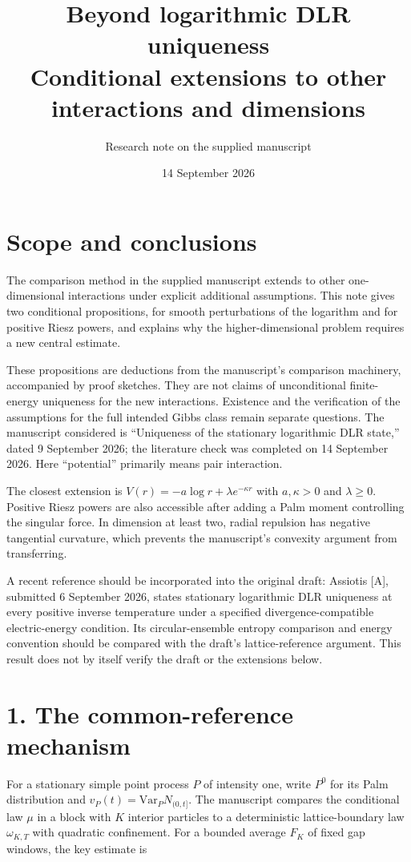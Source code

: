 \documentclass[11pt]{article}
\title{Beyond logarithmic DLR uniqueness\\\large Conditional extensions to other interactions and dimensions}
\author{Research note on the supplied manuscript}
\date{14 September 2026}
\begin{document}
\maketitle
\section*{Scope and conclusions}
The comparison method in the supplied manuscript extends to other one-dimensional interactions under explicit additional assumptions. This note gives two conditional propositions, for smooth perturbations of the logarithm and for positive Riesz powers, and explains why the higher-dimensional problem requires a new central estimate.

These propositions are deductions from the manuscript's comparison machinery, accompanied by proof sketches. They are not claims of unconditional finite-energy uniqueness for the new interactions. Existence and the verification of the assumptions for the full intended Gibbs class remain separate questions. The manuscript considered is ``Uniqueness of the stationary logarithmic DLR state,'' dated 9 September 2026; the literature check was completed on 14 September 2026. Here ``potential'' primarily means pair interaction.

The closest extension is $V(r)=-a\log r+\lambda e^{-\kappa r}$ with $a,\kappa>0$ and $\lambda\geq0$. Positive Riesz powers are also accessible after adding a Palm moment controlling the singular force. In dimension at least two, radial repulsion has negative tangential curvature, which prevents the manuscript's convexity argument from transferring.

A recent reference should be incorporated into the original draft: Assiotis [A], submitted 6 September 2026, states stationary logarithmic DLR uniqueness at every positive inverse temperature under a specified divergence-compatible electric-energy condition. Its circular-ensemble entropy comparison and energy convention should be compared with the draft's lattice-reference argument. This result does not by itself verify the draft or the extensions below.

\section*{1. The common-reference mechanism}
For a stationary simple point process $P$ of intensity one, write $P^0$ for its Palm distribution and $v_P(t)=\mathrm{Var}_P N_{(0,t]}$. The manuscript compares the conditional law $\mu$ in a block with $K$ interior particles to a deterministic lattice-boundary law $\omega_{K,T}$ with quadratic confinement. For a bounded average $F_K$ of fixed gap windows, the key estimate is
\end{document}
